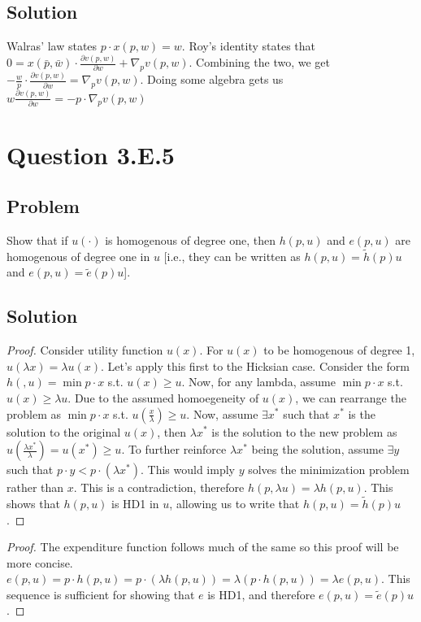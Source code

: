\documentclass[10pt, a4paper]{article}
\begin{document}
    \subsection{Solution}
      Walras' law states $p\cdot x(p,w)=w$. Roy's identity states that $0=x(\bar{p},\bar{w})\cdot\frac{\partial v(p,w)}{\partial w}+\nabla_pv(p,w)$. Combining the two, we get $-\frac{w}{p}\cdot\frac{\partial v(p,w)}{\partial w}=\nabla_p v(p,w)$. Doing some algebra gets us $w\frac{\partial v(p,w)}{\partial w}=-p\cdot\nabla_pv(p,w)$
  \section{Question 3.E.5}
    \subsection{Problem}
      Show that if $u(\cdot)$ is homogenous of degree one, then $h(p,u)$ and $e(p,u)$ are homogenous of degree one in $u$ [i.e., they can be written as $h(p,u)=\tilde{h}(p)u$ and $e(p,u)=\tilde{e}(p)u$].

    \subsection{Solution}
    \begin{proof}
      Consider utility function $u(x)$. For $u(x)$ to be homogenous of degree 1, $u(\lambda x)=\lambda u(x)$. Let's apply this first to the Hicksian case. Consider the form $h(,u)=\min p\cdot x$ s.t. $u(x)\geq u$. Now, for any lambda, assume $\min p\cdot x$ s.t. $u(x)\geq\lambda u$. Due to the assumed homoegeneity of $u(x)$, we can rearrange the problem as $\min p\cdot x$ s.t. $u(\frac{x}{\lambda})\geq u$. Now, assume $\exists x^*$ such that $x^*$ is the solution to the original $u(x)$, then $\lambda x^*$ is the solution to the new problem as $u(\frac{\lambda x^*}{\lambda})=u(x^*)\geq u$. To further reinforce $\lambda x^*$ being the solution, assume $\exists y$ such that $p\cdot y<p\cdot (\lambda x^*)$. This would imply $y$ solves the minimization problem rather than $x$. This is a contradiction, therefore $h(p,\lambda u)=\lambda h(p,u)$. This shows that $h(p,u)$ is HD1 in $u$, allowing us to write that $h(p,u)=\tilde{h}(p)u$.
    \end{proof}

    \begin{proof}
      The expenditure function follows much of the same so this proof will be more concise. $e(p,u)=p\cdot h(p,u) = p\cdot(\lambda h(p,u))=\lambda(p\cdot h(p,u))=\lambda e(p,u)$. This sequence is sufficient for showing that $e$ is HD1, and therefore $e(p,u)=\tilde{e}(p)u$.
    \end{proof}
\end{document}

